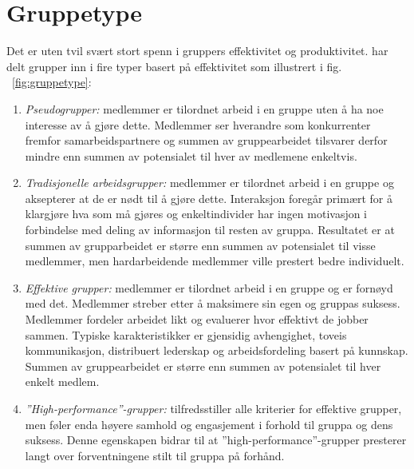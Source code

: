 \section{Gruppetype}
Det er uten tvil svært stort spenn i gruppers effektivitet og produktivitet. \cite{gruppeteori} har delt grupper inn i fire typer basert på effektivitet som illustrert i fig. ~\ref{fig:gruppetype}:
\begin{enumerate}
\item \textit{Pseudogrupper:} medlemmer er tilordnet arbeid i en gruppe uten å ha noe interesse av å gjøre dette. Medlemmer ser hverandre som konkurrenter fremfor samarbeidspartnere og summen av gruppearbeidet tilsvarer derfor mindre enn summen av potensialet til hver av medlemene enkeltvis. \cite{gruppeteori}
\item \textit{Tradisjonelle arbeidsgrupper:} medlemmer er tilordnet arbeid i en gruppe og aksepterer at de er nødt til å gjøre dette. Interaksjon foregår primært for å klargjøre hva som må gjøres og enkeltindivider har ingen motivasjon i forbindelse med deling av informasjon til resten av gruppa. Resultatet er at summen av grupparbeidet er større enn summen av potensialet til visse medlemmer, men hardarbeidende medlemmer ville prestert bedre individuelt. \cite{gruppeteori}

\item \textit{Effektive grupper:} medlemmer er tilordnet arbeid i en gruppe og er fornøyd med det. Medlemmer streber etter å maksimere sin egen og gruppas suksess. Medlemmer fordeler arbeidet likt og evaluerer hvor effektivt de jobber sammen. Typiske karakteristikker er gjensidig avhengighet, toveis kommunikasjon, distribuert lederskap og arbeidsfordeling basert på kunnskap. Summen av gruppearbeidet er større enn summen av potensialet til hver enkelt medlem. \cite{gruppeteori}

\item \textit{''High-performance''-grupper:} tilfredsstiller alle kriterier for effektive grupper, men føler enda høyere samhold og engasjement i forhold til gruppa og dens suksess. Denne egenskapen bidrar til at ''high-performance''-grupper presterer langt over forventningene stilt til gruppa på forhånd. \cite{gruppeteori}


\end{enumerate}
